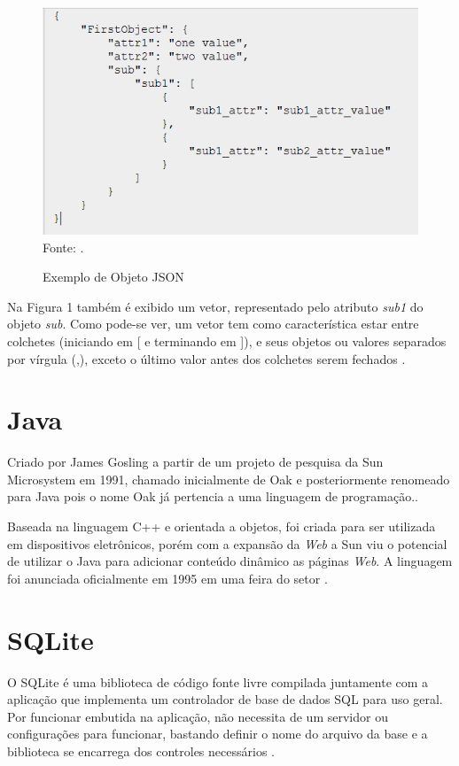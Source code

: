 \begin{figure}[!htb]
     \centering
     \caption{Exemplo de Objeto JSON}
     \includegraphics[scale=1]{imagens/exemplojson.png}
     \\ Fonte: \cite{JSONLint}.
\end{figure}

Na Figura 1 também é exibido um vetor, representado pelo atributo \emph{sub1} do objeto \emph{sub}. Como pode-se ver, um vetor tem como característica estar entre colchetes (iniciando em [ e terminando em ]), e seus objetos ou valores separados por vírgula (,), exceto o último valor antes dos colchetes serem fechados \cite{JSON}.

\section{Java}

Criado por James Gosling a partir de um projeto de pesquisa da Sun Microsystem em 1991, chamado inicialmente de Oak e posteriormente renomeado para Java pois o nome Oak já pertencia a uma linguagem de programação.\cite{java_deitel}.

Baseada na linguagem C++ e orientada a objetos, foi criada para ser utilizada em dispositivos eletrônicos, porém com a expansão da \emph{Web} a Sun viu o potencial de utilizar o Java para adicionar conteúdo dinâmico as páginas \emph{Web}. A linguagem foi anunciada oficialmente em 1995 em uma feira do setor \cite{java_deitel}.

\section{SQLite}
O SQLite é uma biblioteca de código fonte livre compilada juntamente com a aplicação que implementa um controlador de base de dados SQL para uso geral. Por funcionar embutida na aplicação, não necessita de um servidor ou configurações para funcionar, bastando definir o nome do arquivo da base e a biblioteca se encarrega dos controles necessários \cite{SQLite}.

